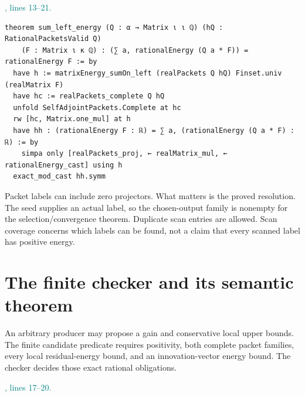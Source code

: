 \documentclass[11pt]{article}\usepackage{needspace}\renewcommand{\paperkind}{Lean companion}\setlength{\parskip}{0.35em}
\begin{document}

{\small\textcolor{teal}{, lines 13--21.}\par}

\begin{lstlisting}[style=BayesSource]
theorem sum_left_energy (Q : α → Matrix ι ι ℚ) (hQ : RationalPacketsValid Q)
    (F : Matrix ι κ ℚ) : (∑ a, rationalEnergy (Q a * F)) = rationalEnergy F := by
  have h := matrixEnergy_sumOn_left (realPackets Q hQ) Finset.univ (realMatrix F)
  have hc := realPackets_complete Q hQ
  unfold SelfAdjointPackets.Complete at hc
  rw [hc, Matrix.one_mul] at h
  have hh : (rationalEnergy F : ℝ) = ∑ a, (rationalEnergy (Q a * F) : ℝ) := by
    simpa only [realPackets_proj, ← realMatrix_mul, ← rationalEnergy_cast] using h
  exact_mod_cast hh.symm
\end{lstlisting}

Packet labels can include zero projectors. What matters is the proved resolution. The seed supplies an actual label, so the chosen-output family is nonempty for the selection/convergence theorem. Duplicate scan entries are allowed. Scan coverage concerns which labels can be found, not a claim that every scanned label has positive energy.

\section{The finite checker and its semantic theorem}

An arbitrary producer may propose a gain and conservative local upper bounds. The finite candidate predicate requires positivity, both complete packet families, every local residual-energy bound, and an innovation-vector energy bound. The checker decides those exact rational obligations.



{\small\textcolor{teal}{, lines 17--20.}\par}
\end{document}

